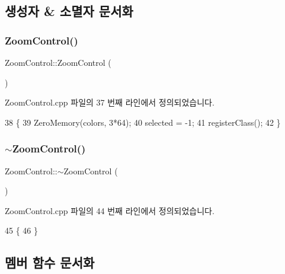 \subsection{생성자 \& 소멸자 문서화}
\mbox{\label{class_zoom_control_a25717ea859dbfc8cea82698d01c1db32}} 
\subsubsection{\texorpdfstring{Zoom\+Control()}{ZoomControl()}}
{\footnotesize\ttfamily Zoom\+Control\+::\+Zoom\+Control (\begin{DoxyParamCaption}{ }\end{DoxyParamCaption})}



Zoom\+Control.\+cpp 파일의 37 번째 라인에서 정의되었습니다.


\begin{DoxyCode}
38 \{
39   ZeroMemory(colors, 3*64);
40   selected = -1;
41   registerClass();
42 \}
\end{DoxyCode}
\mbox{\label{class_zoom_control_aa31326d68ae9e4afbbf8e1375fb06f75}} 
\subsubsection{\texorpdfstring{$\sim$\+Zoom\+Control()}{~ZoomControl()}}
{\footnotesize\ttfamily Zoom\+Control\+::$\sim$\+Zoom\+Control (\begin{DoxyParamCaption}{ }\end{DoxyParamCaption})\hspace{0.3cm}{\ttfamily [virtual]}}



Zoom\+Control.\+cpp 파일의 44 번째 라인에서 정의되었습니다.


\begin{DoxyCode}
45 \{
46 \}
\end{DoxyCode}


\subsection{멤버 함수 문서화}
\mbox{\label{class_zoom_control_a9efd77599efc02d9059a797b59a7911f}} 
